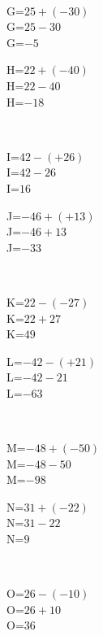 \documentclass{article}%
\begin{document}
\\%
\begin{minipage}{0.5\textwidth}%
G=$25+(-30)$\\%
G=$25-30$\\%
G=$-5$\\%
\end{minipage}%
\begin{minipage}{0.5\textwidth}%
H=$22+(-40)$\\%
H=$22-40$\\%
H=$-18$\\%
\end{minipage}%
\\%
\begin{minipage}{0.5\textwidth}%
I=$42-(+26)$\\%
I=$42-26$\\%
I=$16$\\%
\end{minipage}%
\begin{minipage}{0.5\textwidth}%
J=$-46+(+13)$\\%
J=$-46+13$\\%
J=$-33$\\%
\end{minipage}%
\\%
\begin{minipage}{0.5\textwidth}%
K=$22-(-27)$\\%
K=$22+27$\\%
K=$49$\\%
\end{minipage}%
\begin{minipage}{0.5\textwidth}%
L=$-42-(+21)$\\%
L=$-42-21$\\%
L=$-63$\\%
\end{minipage}%
\\%
\begin{minipage}{0.5\textwidth}%
M=$-48+(-50)$\\%
M=$-48-50$\\%
M=$-98$\\%
\end{minipage}%
\begin{minipage}{0.5\textwidth}%
N=$31+(-22)$\\%
N=$31-22$\\%
N=$9$\\%
\end{minipage}%
\\%
\begin{minipage}{0.5\textwidth}%
O=$26-(-10)$\\%
O=$26+10$\\%
O=$36$\\%
\end{minipage}%
\end{document}
